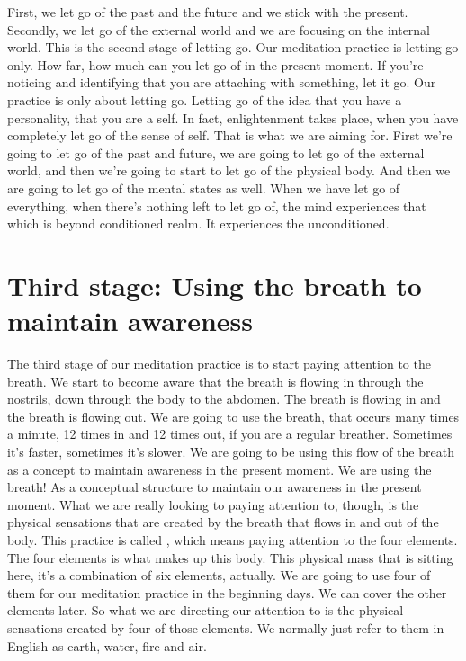 \documentclass[letterpaper,10pt,english]{sphinxmanual}
\begin{document}
\sphinxAtStartPar
First, we let go of the past and the future and we stick with the present.
Secondly, we let go of the external world and we are focusing on the internal
world. This is the second stage of letting go. Our meditation practice is letting go only. How far, how much can you let go of in the present moment.
If you’re noticing and identifying that you are attaching with something, let
it go. Our practice is only about letting go.
Letting go of the idea that you have a personality, that you
are a self. In fact, enlightenment takes place, when you have completely let
go of the sense of self. That is what we are aiming for. First we’re going to
let go of the past and future, we are going to let go of the external world,
and then we’re going to start to let go of the physical body. And then we are
  going to let go of the mental states as well. When we have let go of everything, when there’s nothing left to let go of, the mind experiences that which
is beyond conditioned realm. It experiences the unconditioned.


\section{Third stage: Using the breath to maintain awareness}
\label{\detokenize{0-b:third-stage-using-the-breath-to-maintain-awareness}}
\sphinxAtStartPar
The third stage of our meditation practice is to start paying attention to
the breath. We start to become aware that the breath is flowing in through the
nostrils, down through the body to the abdomen. The breath is flowing in and
the breath is flowing out. We are going to use the breath, that occurs many
times a minute, 12 times in and 12 times out, if you are a regular breather.
Sometimes it’s faster, sometimes it’s slower. We are going to be using this
flow of the breath as a concept to maintain awareness in the present moment.
We are using the breath! As a conceptual structure to maintain our awareness
in the present moment. What we are really looking to paying attention to,
though, is the physical sensations that are created by the breath that flows in
and out of the body. This practice is called
,
which  means  paying  attention  to  the  four  elements.  The  four  elements  is
what makes up this body. This physical mass that is sitting here, it’s a combination of six elements, actually. We are going to use four of them for our
meditation practice in the beginning days. We can cover the other elements
later. So what we are directing our attention to is the physical sensations created by four of those elements. We normally just refer to them in English as
earth, water, fire and air.
\end{document}
